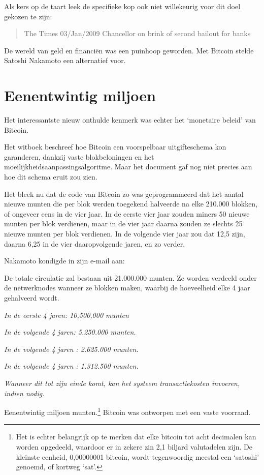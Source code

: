 \documentclass[
  a5paper,
  smalldemyvopaper,11pt,twoside,onecolumn,openright,extrafontsizes]{memoir}
\begin{document}
Als kers op de taart leek de specifieke kop ook niet willekeurig voor
dit doel gekozen te zijn:

\begin{quote}
The Times 03/Jan/2009 Chancellor on brink of second bailout for banks
\end{quote}

De wereld van geld en financiën was een puinhoop geworden. Met Bitcoin
stelde Satoshi Nakamoto een alternatief voor.

\section{Eenentwintig miljoen}\label{eenentwintig-miljoen}

Het interessantste nieuw onthulde kenmerk was echter het `monetaire
beleid' van Bitcoin.

Het witboek beschreef hoe Bitcoin een voorspelbaar uitgifteschema kon
garanderen, dankzij vaste blokbeloningen en het
moeilijkheidsaanpassingsalgoritme. Maar het document gaf nog niet
precies aan hoe dit schema eruit zou zien.

Het bleek nu dat de code van Bitcoin zo was geprogrammeerd dat het
aantal nieuwe munten die per blok werden toegekend halveerde na elke
210.000 blokken, of ongeveer eens in de vier jaar. In de eerste vier
jaar zouden miners 50 nieuwe munten per blok verdienen, maar in de vier
jaar daarna zouden ze slechts 25 nieuwe munten per blok verdienen. In de
volgende vier jaar zou dat 12,5 zijn, daarna 6,25 in de vier
daaropvolgende jaren, en zo verder.

Nakamoto kondigde in zijn e-mail aan:

De totale circulatie zal bestaan uit 21.000.000 munten. Ze worden
verdeeld onder de netwerknodes wanneer ze blokken maken, waarbij de
hoeveelheid elke 4 jaar gehalveerd wordt.

\emph{In de eerste 4 jaren: 10,500,000 munten}

\emph{In de volgende 4 jaren: 5.250.000 munten.}

\emph{In de volgende 4 jaren : 2.625.000 munten.}

\emph{In de volgende 4 jaren : 1.312.500 munten.}

\emph{Wanneer dit tot zijn einde komt, kan het systeem transactiekosten
invoeren, indien nodig.}

Eenentwintig miljoen munten.\footnote{Het is echter belangrijk op te
  merken dat elke bitcoin tot acht decimalen kan worden opgedeeld,
  waardoor er in zekere zin 2,1 biljard valutadelen zijn. De kleinste
  eenheid, 0,00000001 bitcoin, wordt tegenwoordig meestal een `satoshi'
  genoemd, of kortweg `sat'.} Bitcoin was ontworpen met een vaste
voorraad.
\end{document}
